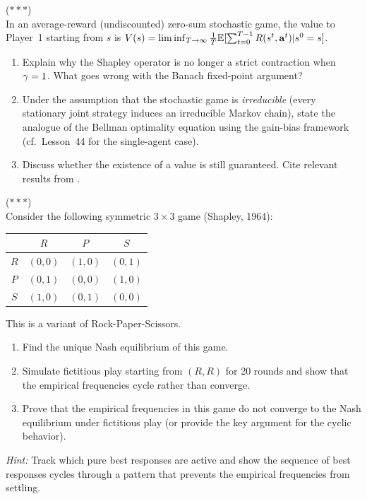 \documentclass[11pt,a4paper]{article}
\begin{document}
\begin{exercise}
  \textnormal{(\(***\))} \\
  In an average-reward (undiscounted) zero-sum stochastic game, the
  value to Player~1 starting from $s$ is
  $V(s) = \liminf_{T \to \infty} \frac{1}{T}
  \mathbb{E}[\sum_{t=0}^{T-1} R(s^t, \mathbf{a}^t) | s^0 = s]$.
  \begin{enumerate}[label=(\alph*)]
    \item Explain why the Shapley operator is no longer a strict
      contraction when $\gamma = 1$.  What goes wrong with the
      Banach fixed-point argument?
    \item Under the assumption that the stochastic game is
      \emph{irreducible} (every stationary joint strategy induces
      an irreducible Markov chain), state the analogue of the
      Bellman optimality equation using the gain-bias framework
      (cf.\ Lesson~44 for the single-agent case).
    \item Discuss whether the existence of a value is still
      guaranteed.  Cite relevant results from \citet{filar1997}.
  \end{enumerate}
\end{exercise}

\begin{exercise}
  \textnormal{(\(***\))} \\
  Consider the following symmetric $3 \times 3$ game (Shapley, 1964):
  \begin{center}
  \begin{tabular}{c|ccc}
    & $R$ & $P$ & $S$ \\ \hline
    $R$ & $(0, 0)$ & $(1, 0)$ & $(0, 1)$ \\
    $P$ & $(0, 1)$ & $(0, 0)$ & $(1, 0)$ \\
    $S$ & $(1, 0)$ & $(0, 1)$ & $(0, 0)$
  \end{tabular}
  \end{center}
  This is a variant of Rock-Paper-Scissors.
  \begin{enumerate}[label=(\alph*)]
    \item Find the unique Nash equilibrium of this game.
    \item Simulate fictitious play starting from $(R, R)$ for 20
      rounds and show that the empirical frequencies cycle rather
      than converge.
    \item Prove that the empirical frequencies in this game do not
      converge to the Nash equilibrium under fictitious play (or
      provide the key argument for the cyclic behavior).
  \end{enumerate}

  \textit{Hint:} Track which pure best responses are active and
  show the sequence of best responses cycles through a pattern
  that prevents the empirical frequencies from settling.
\end{exercise}
\end{document}
